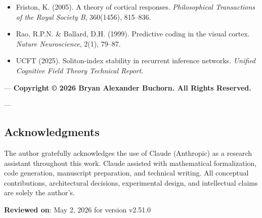 \begin{itemize}
\item [friston\-2005\-theory] Friston, K. (2005). A theory of cortical responses. \textit{Philos\-ophical Transa\-ctions of the Royal Society B}, 360(1456), 815–836.
\item [rao\-1999\-predi\-ctive] Rao, R.P.N. \& Ballard, D.H. (1999). Predictive coding in the visual cortex. \textit{Nature Neuros\-cience}, 2(1), 79–87.
\item [ucft\-2025\-soliton] UCFT (2025). Soliton-index stability in recurrent inference networks. \textit{Unified Cognitive Field Theory Technical Report}.

\end{itemize}
---
\textbf{Copyright © 2026 Bryan Alexander Buchorn. All Rights Reserved.}

---
\subsection{Acknow\-ledgments}

The author gratefully ackno\-wledges the use of Claude (Anthropic) as a research assistant throughout this work. Claude assisted with mathe\-matical forma\-lization, code generation, manuscript preparation, and technical writing. All conceptual contr\-ibutions, archi\-tectural decisions, exper\-imental design, and intel\-lectual claims are solely the author's.

\textbf{Reviewed on}: May 2, 2026 for version v2.51.0
